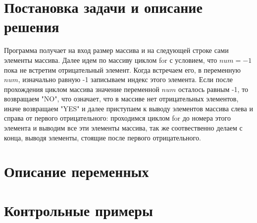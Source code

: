 \documentclass[a4paper,12pt]{report}
\begin{document}
\section*{Постановка задачи и описание решения}
\par
Программа получает на вход размер массива и на следующей строке сами элементы массива.
Далее идем по массиву циклом for с условием, что $num=-1$ пока не встретим отрицательный элемент. Когда встречаем его, в переменную $num$, изначально равную -1 записываем индекс этого элемента.
Если после прохождения циклом массива значение переменной $num$ осталось равным -1, то возвращаем "NO", что означает, что в массиве нет отрицательных элементов, иначе возвращаем "YES" и далее приступаем к выводу элементов массива слева и справа от первого отрицательного:
проходимся циклом for до номера этого элемента и выводим все эти элементы массива, так же соотвественно делаем с конца, выводя элементы, стоящие после первого отрицательного. 

\section*{Описание переменных}
\begin{centering}
\end{centering}

\section*{Контрольные примеры}

\begin{centering}
\end{centering}
\newpage
\end{document}
